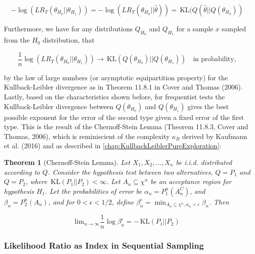 \documentclass[11pt,]{article}
\newtheorem{theorem}{Theorem}
\newcommand{\KL}{\,\text{KL}}
\begin{document}
\[
-\log(LR_T(\theta_{H_0}|| \theta_{H_1})) = -\log(LR_T(\theta_{H_0}|| \hat{\theta})) = \KL(Q(\hat{\theta}||Q(\theta_{H_0}))
\]

Furthermore, we have for any distributions \(Q_{H_0}\) and \(Q_{H_1}\)
for a sample \(x\) sampled from the \(H_0\) distribution, that

\[
\frac{1}{n} \log(LR_T(\theta_{H_0}||\theta_{H_1})) \rightarrow \KL(Q(\theta_{H_0})||Q(\theta_{H_1})) \quad \text{in probability},
\]

by the law of large numbers (or asymptotic equipartition property) for
the Kullback-Leibler divergence as in Theorem 11.8.1 in Cover and Thomas
(2006). Lastly, based on the characteristics shown before, for
frequentist tests the Kullback-Leibler divergence between
\(Q(\theta_{H_0})\) and \(Q(\theta_{H_1})\) gives the best possible
exponent for the error of the second type given a fixed error of the
first type. This is the result of the Chernoff-Stein Lemma (Theorem
11.8.3, Cover and Thomas, 2006), which is reminiscient of the complexity
\(\kappa_B\) derived by Kaufmann et al. (2016) and as described in
\autoref{chap:KullbackLeiblerPureExploration}:

\begin{theorem}[Chernoff-Stein Lemma] \label{theorem:ChernoffStein}
Let $X_1, X_2, ..., X_n$ be i.i.d. distributed according to $Q$. Consider the hypothesis test between two alternatives, $Q=P_1$ and $Q=P_2$, where $\KL(P_1||P_2) < \infty$. Let $A_n \subseteq \chi^n$ be an acceptance region for hypothesis $H_1$. Let the probabilities of error be $\alpha_n = P_1^n(A_n^C)$, and $\beta_n = P_2^n(A_n)$, and for $0< \epsilon <1/2$, define $\beta_n^{\epsilon} = \min_{A_n \subseteq \chi^n, \alpha_n < \epsilon} \beta_n$. Then

$$
\text{lim}_{n\rightarrow \infty} \frac{1}{n} \log \beta_n^{\epsilon} = - \KL(P_1||P_2)
$$
\end{theorem}

\subsubsection{Likelihood Ratio as Index in Sequential
Sampling}\label{likelihood-ratio-as-index-in-sequential-sampling}
\end{document}
